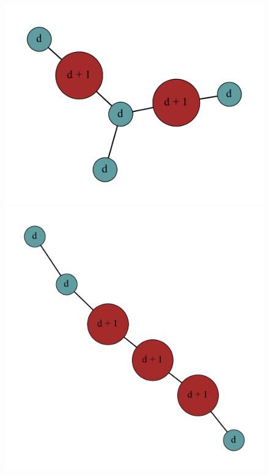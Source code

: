 \documentclass[12pt]{article}
\theoremstyle{plain}
\theoremstyle{definition}
\theoremstyle{remark}
\begin{document}
\begin{figure}[htb]
\includegraphics[scale=0.25]{Superabundance/MaxDegree3Trees/001010011001000[3,3,1,1,1,3].pdf}
\includegraphics[scale=0.25]{Superabundance/MaxDegree3Trees/001010011010000[2,3,1,1,3,3].pdf}

\end{figure}
\end{document}
